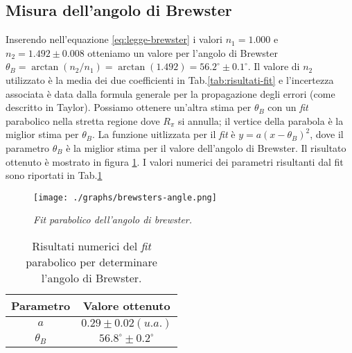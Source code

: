 \subsection{Misura dell'angolo di Brewster}\label{subsec:angolo-di-brewster}
  Inserendo nell'equazione \eqref{eq:legge-brewster} i valori $n_1 = 1.000$ e $n_2 = 1.492 \pm 0.008$
  otteniamo un valore per l'angolo di Brewster $\theta_B = \arctan{(n_2 / n_1)} = \arctan{(1.492)} = 56.2^\circ \pm 0.1^\circ$. Il valore di $n_2$ utilizzato è la media
  dei due coefficienti in Tab.\ref{tab:risultati-fit} e l'incertezza associata è data dalla formula generale per la
  propagazione degli errori (come descritto in Taylor\cite{taylor99}).
  Possiamo ottenere un'altra stima per $\theta_B$ con un \emph{fit} parabolico nella stretta regione
  dove $R_\pi$ si annulla; il vertice della parabola è la miglior stima per $\theta_B$.
  La funzione uitlizzata per il \emph{fit} è $y = a(x - \theta_B)^2$, dove il parametro $\theta_B$ è la
  miglior stima per il valore dell'angolo di Brewster.
  Il risultato ottenuto è mostrato in figura \ref{fig:brewsters-angle}. I valori numerici
  dei parametri risultanti dal fit sono riportati in Tab.\ref{tab:fit-brewster}
  \begin{figure}[h]
    \centering
    \texttt{[image: ./graphs/brewsters-angle.png]}
    \caption{\emph{Fit parabolico dell'angolo di brewster.}}
    \label{fig:brewsters-angle}
  \end{figure}
  \begin{table}[ht]
    \centering
    \caption{
      Risultati numerici del \emph{fit} parabolico per determinare l'angolo di Brewster.
    }
    \begin{tabular}[t]{cc}
      \toprule
      Parametro &Valore ottenuto\\
      \midrule
      $a$ &$0.29 \pm 0.02 (u.a.)$ \\
      $\theta_B$ &$56.8^\circ \pm 0.2^\circ$ \\
      \bottomrule
    \end{tabular}\label{tab:fit-brewster}
  \end{table}
\endinput



